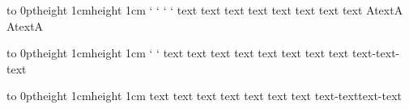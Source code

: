 \hsize=7cm
\parindent=0pt
\showboxdepth\maxdimen
\showboxbreadth\maxdimen
\def\test#1{%
   \vbox to 0pt{\vrule height 1cm\hfill\vrule height 1cm \vss}
   \leavevmode\llap{#1 }\ignorespaces}

\test1
\knbccode\font`
\knaccode\font`
\lpcode\font`
\rpcode\font`
text text text text text
text text text AtextA AtextA

\test2
\knbccode\font`
\knaccode\font`
text text text text text text
text text text-text-text

\test3
text text text text text text
text text-text\-text-text

\bye
